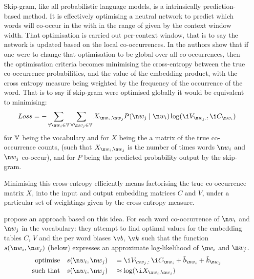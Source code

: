 {

Skip-gram, like all probabilistic language models, is a intrinsically prediction-based method.
It is effectively optimising a neutral network to predict which words will co-occur in the with in the range of given by the context window width.
That optimisation is carried out per-context window, that is to say the network is updated based on the local co-occurrences.
In  the authors show that if one were to change that optimisation to be global over all co-occurrences,
then the optimisation criteria becomes minimising the cross-entropy between the true co-occurrence probabilities, and the value of the embedding product,
with the cross entropy measure being weighted by the frequency of the occurrence of the word.
That is to say if skip-gram were optimised globally it would be equivalent to minimising:
\begin{equation}
Loss = - \sum_{\forall \n w_i \in \set V} \sum_{\forall \n w_j  \in \set V } X_{\n w_i,\n w_j} P(\n w_j\mid \n w_i) \log (\i V_{\n w_j,:}\,\i C_{\n w_i})
\end{equation}
for $\mathbb{V}$ being the vocabulary and for $X$ being the a matrix of the true co-occurrence counts, (such that $X_{\n w_i,\n w_j}$ is the number of times words $\n w_i$ and $\n w_j$ co-occur),
and for $P$ being the predicted probability output by the skip-gram.


Minimising this cross-entropy efficiently means  factorising the true co-occurrence matrix $X$,
into the input and output embedding matrices $C$ and $V$, under a particular set of weightings given by the cross entropy measure.

\textcite{pennington2014glove} propose an approach based on this idea.
For each word co-occurrence of $\n w_i$ and $\n w_j$ in the vocabulary: they attempt to find optimal values for 
the embedding tables $C$, $V$ and the per word biases $\v b$, $\v k$
such that the  function $s(\n w_i, \n w_j)$ (below) expresses an approximate log-likelihood of $\n w_i$ and $\n w_j$.
\begin{align}
\text{optimise} \quad & s(\n w_i, \n w_j) &&= \i V_{\n w_j,:}\,\i C_{\n w_i} + \iv b_{\n w_i} + \iv k_{\n w_j} \\
\text{such that} \quad & s(\n w_i, \n w_j) &&\approx \log(\i X_{\n w_i, \n w_j})
\end{align}

}
